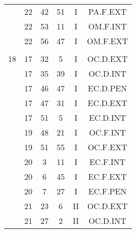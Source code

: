 \documentclass[12pt, a4paper]{article}
\begin{document}
\begin{multicols}{3}
{\begin{tabular}{c c c c c c}
	 	 	 	 & 22 & 42 & 51 & I & PA.F.EXT\\%
	 	 	 	 & 22 & 53 & 11 & I & OM.F.INT\\%
	 	 	 	 & 22 & 56 & 47 & I & OM.F.EXT\\%
	 	 	 	 & & & & & \\%
	 	 	 	18 & 17 & 32 & 5 & I & OC.D.EXT\\%
	 	 	 	 & 17 & 35 & 39 & I & OC.D.INT\\%
	 	 	 	 & 17 & 46 & 47 & I & EC.D.PEN\\%
	 	 	 	 & 17 & 47 & 31 & I & EC.D.EXT\\%
	 	 	 	 & 17 & 51 & 5 & I & EC.D.INT\\%
	 	 	 	 & 19 & 48 & 21 & I & OC.F.INT\\%
	 	 	 	 & 19 & 51 & 55 & I & OC.F.EXT\\%
	 	 	 	 & 20 & 3 & 11 & I & EC.F.INT\\%
	 	 	 	 & 20 & 6 & 45 & I & EC.F.EXT\\%
	 	 	 	 & 20 & 7 & 27 & I & EC.F.PEN\\%
	 	 	 	 & 21 & 23 & 6 & II & OC.D.EXT\\%
	 	 	 	 & 21 & 27 & 2 & II & OC.D.INT\\%
	 	 \end{tabular}
 	}
\end{multicols}
\end{document}
